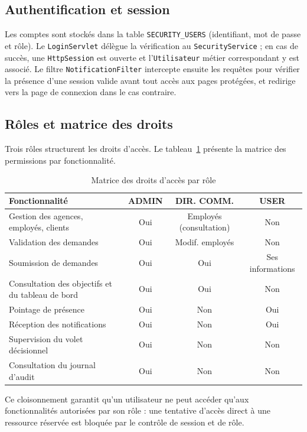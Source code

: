 \subsection{Authentification et session}
Les comptes sont stockés dans la table \texttt{SECURITY\_USERS} (identifiant, mot
de passe et rôle). Le \texttt{LoginServlet} délègue la vérification au
\texttt{SecurityService} ; en cas de succès, une \texttt{HttpSession} est ouverte
et l'\texttt{Utilisateur} métier correspondant y est associé. Le filtre
\texttt{NotificationFilter} intercepte ensuite les requêtes pour vérifier la
présence d'une session valide avant tout accès aux pages protégées, et redirige
vers la page de connexion dans le cas contraire.

\subsection{Rôles et matrice des droits}
Trois rôles structurent les droits d'accès. Le tableau~\ref{tab:permissions}
présente la matrice des permissions par fonctionnalité.

\begin{table}[htbp]
\centering
\caption{Matrice des droits d'accès par rôle}
\label{tab:permissions}
\renewcommand{\arraystretch}{1.25}
\begin{tabularx}{\textwidth}{|X|c|c|c|}
\hline
\textbf{Fonctionnalité} & \textbf{ADMIN} & \textbf{DIR. COMM.} & \textbf{USER}\\
\hline
Gestion des agences, employés, clients & Oui & Employés (consultation) & Non\\
\hline
Validation des demandes & Oui & Modif. employés & Non\\
\hline
Soumission de demandes & Oui & Oui & Ses informations\\
\hline
Consultation des objectifs et du tableau de bord & Oui & Oui & Non\\
\hline
Pointage de présence & Oui & Non & Oui\\
\hline
Réception des notifications & Oui & Non & Oui\\
\hline
Supervision du volet décisionnel & Oui & Non & Non\\
\hline
Consultation du journal d'audit & Oui & Non & Non\\
\hline
\end{tabularx}
\end{table}

Ce cloisonnement garantit qu'un utilisateur ne peut accéder qu'aux fonctionnalités
autorisées par son rôle : une tentative d'accès direct à une ressource réservée
est bloquée par le contrôle de session et de rôle.

